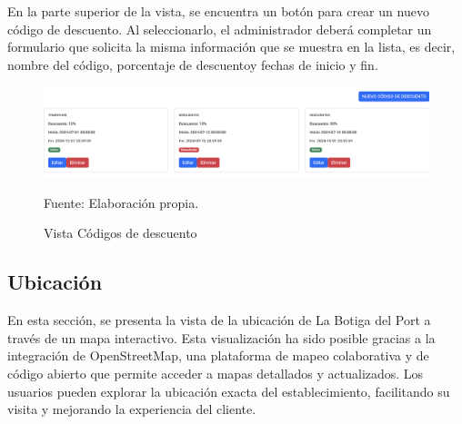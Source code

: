 \vspace{0.5cm}

En la parte superior de la vista, se encuentra un botón para crear un nuevo código de descuento. Al seleccionarlo, el administrador deberá completar un formulario que solicita la misma información que se muestra en la lista, es decir, nombre del código, porcentaje de descuentoy fechas de inicio y fin.

\begin{figure}[H]
\begin{center}
\includegraphics[scale=0.3]{./Images/vistaAdminCodigo.png}
\caption{Vista Códigos de descuento} Fuente: Elaboración propia.

\label{fig:fig2}

\end{center}
\end{figure}

\subsection{Ubicación}\label{subsec5.1.3}

En esta sección, se presenta la vista de la ubicación de La Botiga del Port a través de un mapa interactivo. Esta visualización ha sido posible gracias a la integración de OpenStreetMap, una plataforma de mapeo colaborativa y de código abierto que permite acceder a mapas detallados y actualizados. Los usuarios pueden explorar la ubicación exacta del establecimiento, facilitando su visita y mejorando la experiencia del cliente.

